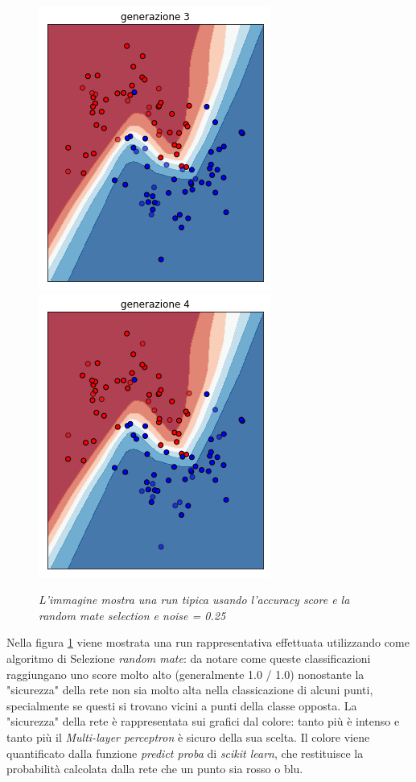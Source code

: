 \documentclass[12pt,a4paper]{report}
\begin{document}
\begin{figure}[H]
 \includegraphics[scale = 0.3]{images/moons-rnd-acc./3}
 \includegraphics[scale = 0.3]{images/moons-rnd-acc./4}
 \caption{\textit{L'immagine mostra una run tipica usando l'accuracy score e la random mate selection e noise = 0.25}}
 \label{moons1}
\end{figure}

Nella figura \ref{moons1} viene mostrata una run rappresentativa effettuata utilizzando come algoritmo di Selezione \textit{random mate}: da notare come queste classificazioni raggiungano uno score molto alto (generalmente 1.0 / 1.0) nonostante la "sicurezza" della rete non sia molto alta nella classicazione di alcuni punti, specialmente se questi si trovano vicini a punti della classe opposta.
La "sicurezza" della rete è rappresentata sui grafici dal colore: tanto più è intenso e tanto  più il \textit{Multi-layer perceptron} è sicuro della sua scelta.
Il colore viene quantificato dalla funzione \textit{predict proba} di \textit{scikit learn}, che restituisce la probabilità calcolata dalla rete che un punto sia rosso o blu.
\end{document}
